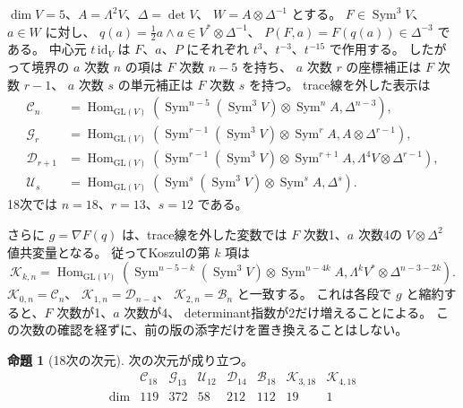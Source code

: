 \documentclass[a4paper,11pt]{ltjsarticle}
\theoremstyle{definition}
\newtheorem{proposition}[theorem]{命題}
\begin{document}
$\dim V=5$、$A=\Lambda^2V$、$\Delta=\det V$、
$W=A\otimes\Delta^{-1}$ とする。
$F\in\operatorname{Sym}^3V$、$a\in W$ に対し、
$q(a)=\tfrac12a\wedge a\in V^*\otimes\Delta^{-1}$、
$P(F,a)=F(q(a))\in\Delta^{-3}$ である。
中心元 $t\,\mathrm{id}_V$ は $F$、$a$、$P$ にそれぞれ
$t^3$、$t^{-3}$、$t^{-15}$ で作用する。
したがって境界の $a$ 次数 $n$ の項は $F$ 次数 $n-5$ を持ち、
$a$ 次数 $r$ の座標補正は $F$ 次数 $r-1$、
$a$ 次数 $s$ の単元補正は $F$ 次数 $s$ を持つ。
trace線を外した表示は
\begin{align*}
\mathcal C_n&=\operatorname{Hom}_{\mathrm{GL}(V)}
 \left(\operatorname{Sym}^{n-5}(\operatorname{Sym}^3V)
 \otimes\operatorname{Sym}^n A,\Delta^{n-3}\right),\\
\mathcal G_r&=\operatorname{Hom}_{\mathrm{GL}(V)}
 \left(\operatorname{Sym}^{r-1}(\operatorname{Sym}^3V)
 \otimes\operatorname{Sym}^r A,A\otimes\Delta^{r-1}\right),\\
\mathcal D_{r+1}&=\operatorname{Hom}_{\mathrm{GL}(V)}
 \left(\operatorname{Sym}^{r-1}(\operatorname{Sym}^3V)
 \otimes\operatorname{Sym}^{r+1} A,\Lambda^4V\otimes\Delta^{r-1}\right),\\
\mathcal U_s&=\operatorname{Hom}_{\mathrm{GL}(V)}
 \left(\operatorname{Sym}^s(\operatorname{Sym}^3V)
 \otimes\operatorname{Sym}^s A,\Delta^s\right).
\end{align*}
18次では $n=18$、$r=13$、$s=12$ である。

さらに $g=\nabla F(q)$ は、trace線を外した変数では
$F$ 次数1、$a$ 次数4の $V\otimes\Delta^2$ 値共変量となる。
従ってKoszulの第 $k$ 項は
\begin{equation}\label{eq:v14-koszul-general-term}
\mathcal K_{k,n}=
\operatorname{Hom}_{\mathrm{GL}(V)}
\left(\operatorname{Sym}^{n-5-k}(\operatorname{Sym}^3V)
 \otimes\operatorname{Sym}^{n-4k}A,
 \Lambda^kV^*\otimes\Delta^{n-3-2k}\right).
\end{equation}
$\mathcal K_{0,n}=\mathcal C_n$、
$\mathcal K_{1,n}=\mathcal D_{n-4}$、
$\mathcal K_{2,n}=\mathcal B_n$ と一致する。
これは各段で $g$ と縮約すると、$F$ 次数が1、$a$ 次数が4、
determinant指数が2だけ増えることによる。
この次数の確認を経ずに、前の版の添字だけを置き換えることはしない。

\begin{proposition}[18次の次元]\label{prop:v14-eighteenth-dimensions}
次の次元が成り立つ。
\[
\begin{array}{c|rrrrrrr}
 &\mathcal C_{18}&\mathcal G_{13}&\mathcal U_{12}&\mathcal D_{14}
 &\mathcal B_{18}&\mathcal K_{3,18}&\mathcal K_{4,18}\\\hline
\dim&119&372&58&212&112&19&1
\end{array}
\]
\end{proposition}
\end{document}
